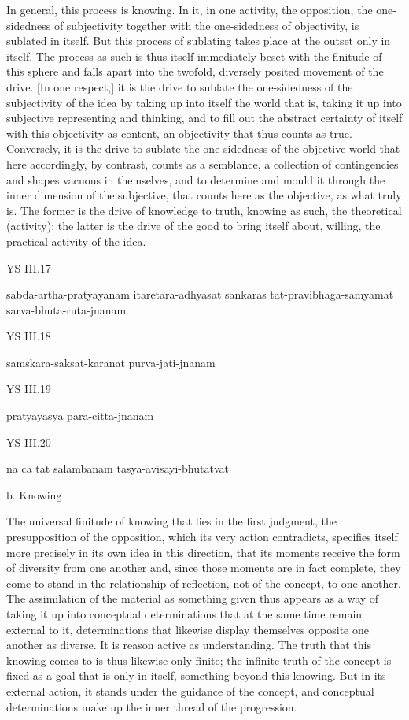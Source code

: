 In general, this process is knowing.
In it, in one activity, the opposition,
the one-sidedness of subjectivity together with
the one-sidedness of objectivity, is sublated in itself.
But this process of sublating takes place at the outset only in itself.
The process as such is thus itself immediately beset with the finitude
of this sphere and falls apart into the twofold, diversely posited
movement of the drive.
[In one respect,] it is the drive to sublate
the one-sidedness of the subjectivity of the idea
by taking up into itself the world that is,
taking it up into subjective representing and thinking,
and to fill out the abstract certainty of itself
with this objectivity as content, an objectivity that thus counts as true.
Conversely, it is the drive to sublate
the one-sidedness of the objective world
that here accordingly, by contrast, counts as a semblance,
a collection of contingencies and shapes vacuous in themselves,
and to determine and mould it through the inner dimension of the subjective,
that counts here as the objective, as what truly is.
The former is the drive of knowledge to truth, knowing as such,
the theoretical (activity);
the latter is the drive of the good to bring itself about, willing,
the practical activity of the idea.

YS III.17

sabda-artha-pratyayanam itaretara-adhyasat sankaras tat-pravibhaga-samyamat sarva-bhuta-ruta-jnanam

YS III.18

samskara-saksat-karanat purva-jati-jnanam

YS III.19

pratyayasya para-citta-jnanam

YS III.20

na ca tat salambanam tasya-avisayi-bhutatvat

b. Knowing

The universal finitude of knowing that lies in the first judgment,
the presupposition of the opposition, which its very action contradicts,
specifies itself more precisely in its own idea in this direction,
that its moments receive the form of diversity from one another and,
since those moments are in fact complete, they come to stand in
the relationship of reflection, not of the concept, to one another.
The assimilation of the material as something given thus appears as
a way of taking it up into conceptual determinations that at the same time
remain external to it, determinations that likewise display themselves
opposite one another as diverse.
It is reason active as understanding.
The truth that this knowing comes to is thus likewise only finite;
the infinite truth of the concept is fixed as a goal that is only in itself,
something beyond this knowing.
But in its external action, it stands under the guidance of the concept,
and conceptual determinations make up the inner thread of the progression.

